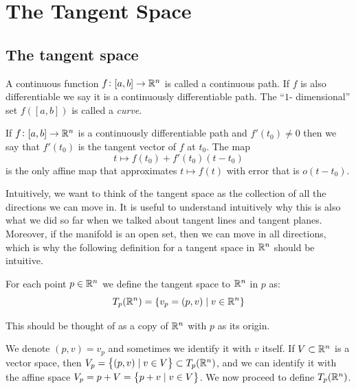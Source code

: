 \documentclass[11pt,a4paper]{article}
\begin{document}
\newpage

\section{The Tangent Space}
\label{sec:tangent-space}
\subsection{The tangent space}
\begin{definition}
  A continuous function $f \colon [a,b] \to \mathbb{R}^n$ is called a
  continuous path. If $f$ is also differentiable we say
  it is a continuously differentiable path. The ``$1$-
  dimensional'' set $f([a,b])$ is called a \textit{curve}.
\end{definition}

\begin{remark}
  If $f \colon [a,b] \to \mathbb{R}^n$ is a continuously differentiable path
  and $f'(t_0) \neq 0$ then we say that $f'(t_0)$ is the tangent vector
  of $f$ at $t_0$.
  The map
  \[
    t \mapsto f(t_0) + f'(t_0)(t - t_0)
  \]
  is the only affine map that approximates $t \mapsto f(t)$ with error
  that is $o(t - t_0)$.
\end{remark}

\begin{remark}
  Intuitively, we want to think of the tangent space as the collection
  of all the directions we can move in.
  It is useful to understand intuitively why this is also what we did
  so far when we talked about tangent lines and tangent planes.
  Moreover, if the manifold is an open set,
  then we can move in all directions,
  which is why the following definition for a tangent space in $\mathbb{R}^n$
  should be intuitive.
\end{remark}

\begin{definition}
  For each point $p \in \mathbb{R}^n$ we define the tangent space
  to $\mathbb{R}^n$ in $p$ as:
  \[
    T_p(\mathbb{R}^n) = \{v_p = (p,v) \mid v \in \mathbb{R}^n\}
  \]
\end{definition}
\begin{remark}
  This should be thought of as a copy of $\mathbb{R}^n$
  with $p$ as its origin.
\end{remark}

\begin{remark}
  We denote $(p,v) = v_p$ and sometimes we identify it with $v$ itself.
  If $V \subset \mathbb{R}^n$ is a vector space,
  then $V_p = \left\{(p,v) \mid v \in V\right\} \subset T_p(\mathbb{R}^n)$,
  and we can identify it with 
  the affine space $V_p = p + V = \left\{p + v \mid v \in V\right\}$.
  We now proceed to define $T_p(\mathbb{R}^n)$.
\end{remark}
\end{document}
